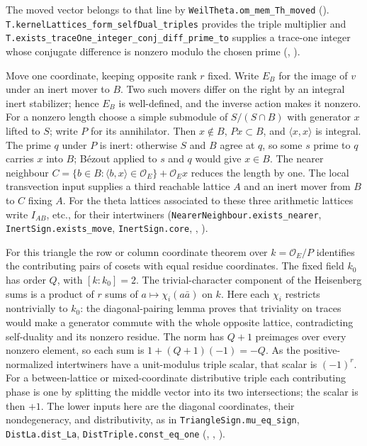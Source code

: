 The moved vector belongs to that line by
\nolinkurl{WeilTheta.om_mem_Th_moved}
().
\nolinkurl{T.kernelLattices_form_selfDual_triples} provides the
triple multiplier and \nolinkurl{T.exists_traceOne_integer_conj_diff_prime_to}
supplies a trace-one integer whose conjugate difference is nonzero
modulo the chosen prime (,
).

Move one coordinate, keeping opposite rank $r$ fixed. Write $E_B$ for
the image of $v$ under an inert mover to $B$. Two such movers differ
on the right by an integral inert stabilizer; hence $E_B$ is
well-defined, and the inverse action makes it nonzero. For a nonzero
length choose a simple submodule of $S/(S\cap B)$ with generator
$x$ lifted to $S$; write $P$ for its annihilator. Then $x\notin B$,
$Px\subset B$, and $\langle x,x\rangle$ is integral. The prime $q$
under $P$ is inert: otherwise $S$ and $B$ agree at $q$, so some
$s$ prime to $q$ carries $x$ into $B$; B\'ezout applied to $s$ and
$q$ would give $x\in B$. The nearer neighbour
$C=\{b\in B:\langle b,x\rangle\in\mathcal O_E\}+\mathcal O_E x$
reduces the length by one. The local transvection input supplies a
third reachable lattice $A$ and an inert mover from $B$ to $C$ fixing
$A$. For the theta lattices associated to these three arithmetic
lattices write $I_{AB}$, etc., for their intertwiners
(\nolinkurl{NearerNeighbour.exists_nearer}, \nolinkurl{InertSign.exists_move},
\nolinkurl{InertSign.core},
,
).

For this triangle the row or column coordinate theorem over $k=\mathcal O_E/P$
identifies the contributing pairs of cosets with equal residue coordinates.
The fixed field $k_0$ has order $Q$, with $[k:k_0]=2$. The
trivial-character component of the Heisenberg sums is a product of $r$
sums of $a\mapsto\chi_i(a\bar a)$ on $k$. Here each $\chi_i$ restricts
nontrivially to $k_0$: the diagonal-pairing lemma proves that triviality
on traces would make a generator commute with the whole opposite
lattice, contradicting self-duality and its nonzero residue. The norm
has $Q+1$ preimages over every nonzero element, so each sum is
$1+(Q+1)(-1)=-Q$. As the positive-normalized intertwiners have a
unit-modulus triple scalar, that scalar is $(-1)^r$. For a between-lattice
or mixed-coordinate distributive triple each contributing phase is one
by splitting the middle vector into its two intersections; the scalar is
then $+1$. The lower inputs here are the diagonal coordinates, their
nondegeneracy, and distributivity, as in
\nolinkurl{TriangleSign.mu_eq_sign}, \nolinkurl{DistLa.dist_La},
\nolinkurl{DistTriple.const_eq_one}
(,
,
).

